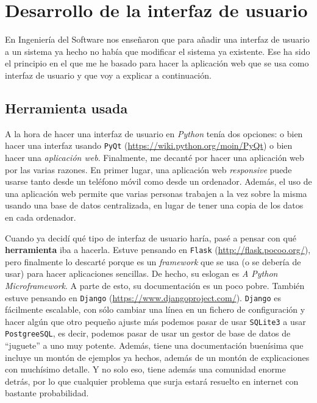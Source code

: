\chapter{Desarrollo de la interfaz de usuario}
En Ingeniería del Software nos enseñaron que para añadir una interfaz de usuario a un sistema ya hecho no había que modificar el sistema ya existente. Ese ha sido el principio en el que me he basado para hacer la aplicación web que se usa como interfaz de usuario y que voy a explicar a continuación.

\section{Herramienta usada}
A la hora de hacer una interfaz de usuario en \textit{Python} tenía dos opciones: o bien hacer una interfaz usando \texttt{PyQt} (\url{https://wiki.python.org/moin/PyQt}) o bien hacer una \textit{aplicación web}. Finalmente, me decanté por hacer una aplicación web por las varias razones. En primer lugar, una aplicación web \textit{responsive} puede usarse tanto desde un teléfono móvil como desde un ordenador. Además, el uso de una aplicación web permite que varias personas trabajen a la vez sobre la misma usando una base de datos centralizada, en lugar de tener una copia de los datos en cada ordenador.

Cuando ya decidí qué tipo de interfaz de usuario haría, pasé a pensar con qué \textbf{herramienta} iba a hacerla. Estuve pensando en \texttt{Flask} (\url{http://flask.pocoo.org/}), pero finalmente lo descarté porque es un \textit{framework} que se usa (o se debería de usar) para hacer aplicaciones sencillas. De hecho, su eslogan es \textit{A Python Microframework}. A parte de esto, su documentación es un poco pobre. También estuve pensando en \texttt{Django} (\url{https://www.djangoproject.com/}). \texttt{Django} es fácilmente escalable, con sólo cambiar una línea en un fichero de configuración y hacer algún que otro pequeño ajuste más podemos pasar de usar \texttt{SQLite3} a usar \texttt{PostgreeSQL}, es decir, podemos pasar de usar un gestor de base de datos de ``juguete'' a uno muy potente. Además, tiene una documentación buenísima que incluye un montón de ejemplos ya hechos, además de un montón de explicaciones con muchísimo detalle. Y no solo eso, tiene además una comunidad enorme detrás, por lo que cualquier problema que surja estará resuelto en internet con bastante probabilidad.

